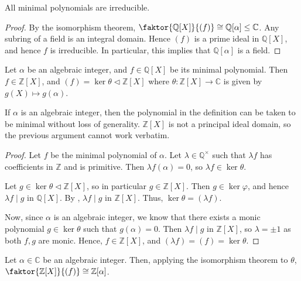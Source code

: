 \begin{corollary}
	All minimal polynomials are irreducible.
\end{corollary}

\begin{proof}
	By the isomorphism theorem, $\faktor{\mathbb Q[X]}{(f)} \cong \mathbb Q[\alpha] \leq \mathbb C$.
	Any subring of a field is an integral domain.
	Hence $(f)$ is a prime ideal in $\mathbb Q[X]$, and hence $f$ is irreducible.
	In particular, this implies that $\mathbb Q[\alpha]$ is a field.
\end{proof} 

\begin{proposition} \label{12.4}
	Let $\alpha$ be an algebraic integer, and $f \in \mathbb Q[X]$ be its minimal polynomial.
	Then $f \in \mathbb Z[X]$, and $(f) = \ker \theta \triangleleft \mathbb Z[X]$ where $\theta : \mathbb Z[X] \to \mathbb C$ is given by $g(X) \mapsto g(\alpha)$.
\end{proposition}

\begin{remark}
	If $\alpha$ is an algebraic integer, then the polynomial in the definition can be taken to be minimal without loss of generality.
	$\mathbb Z[X]$ is not a principal ideal domain, so the previous argument cannot work verbatim.
\end{remark}

\begin{proof}
	Let $f$ be the minimal polynomial of $\alpha$.
	Let $\lambda \in \mathbb Q^\times$ such that $\lambda f$ has coefficients in $\mathbb Z$ and is primitive.
	Then $\lambda f(\alpha) = 0$, so $\lambda f \in \ker \theta$.

	Let $g \in \ker \theta \triangleleft \mathbb{Z}[X]$, so in particular $g \in \mathbb Z[X]$.
	Then $g \in \ker \varphi$, and hence $\lambda f \mid g$ in $\mathbb Q[X]$.
	By , $\lambda f \mid g$ in $\mathbb Z[X]$.
	Thus, $\ker \theta = (\lambda f)$.

	Now, since $\alpha$ is an algebraic integer, we know that there exists a monic polynomial $g \in \ker \theta$ such that $g(\alpha) = 0$.
	Then $\lambda f \mid g$ in $\mathbb Z[X]$, so $\lambda = \pm 1$ as both $f, g$ are monic.
	Hence, $f \in \mathbb Z[X]$, and $(\lambda f) = (f) = \ker \theta$.
\end{proof}

Let $\alpha \in \mathbb C$ be an algebraic integer.
Then, applying the isomorphism theorem to $\theta$, $\faktor{\mathbb Z[X]}{(f)} \cong \mathbb Z[\alpha]$.


